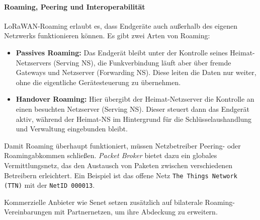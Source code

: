 \paragraph*{Roaming, Peering und Interoperabilität}
LoRaWAN-Roaming erlaubt es, dass Endgeräte auch außerhalb des eigenen Netzwerks funktionieren können. Es gibt zwei Arten von Roaming:

\begin{itemize}
  \item \textbf{Passives Roaming:} Das Endgerät bleibt unter der Kontrolle seines Heimat-Netzservers (Serving NS), die Funkverbindung läuft aber über fremde Gateways und Netzserver (Forwarding NS). Diese leiten die Daten nur weiter, ohne die eigentliche Gerätesteuerung zu übernehmen.
  \item \textbf{Handover Roaming:} Hier übergibt der Heimat-Netzserver die Kontrolle an einen besuchten Netzserver (Serving NS). Dieser steuert dann das Endgerät aktiv, während der Heimat-NS im Hintergrund für die Schlüsselaushandlung und Verwaltung eingebunden bleibt.
\end{itemize}

Damit Roaming überhaupt funktioniert, müssen Netzbetreiber Peering- oder Roamingabkommen schließen. 
\emph{Packet Broker} bietet dazu ein globales Vermittlungsnetz, das den Austausch von Paketen zwischen verschiedenen Betreibern erleichtert. Ein Beispiel ist das offene Netz \texttt{The Things Network (TTN)} mit der \texttt{NetID~000013}. 

Kommerzielle Anbieter wie Senet setzen zusätzlich auf bilaterale Roaming-Vereinbarungen mit Partnernetzen, um ihre Abdeckung zu erweitern. \cite{LoRaWANBackendInterfaces11,PacketBroker,TTNNetID,SenetExt}